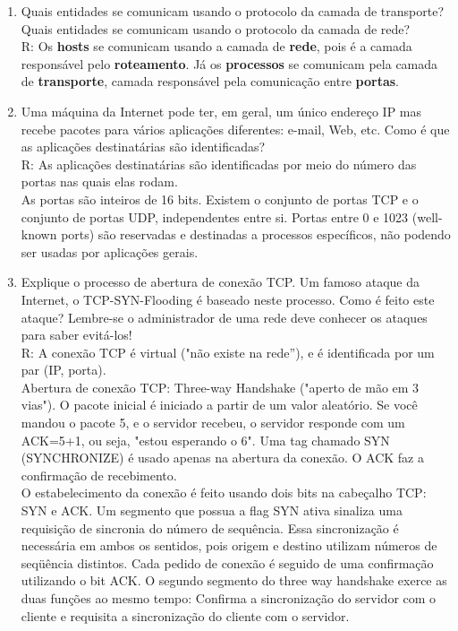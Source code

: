 \documentclass{article}
\begin{document}
\begin{enumerate}

	\item Quais entidades se comunicam usando o protocolo da camada de transporte? Quais entidades se comunicam usando o protocolo da camada de rede?
	\\
	R: Os \textbf{hosts} se comunicam usando a camada de \textbf{rede}, pois é a camada responsável pelo \textbf{roteamento}. Já os \textbf{processos} se comunicam pela camada de
	\textbf{transporte}, camada responsável pela comunicação entre \textbf{portas}.

	\item Uma máquina da Internet pode ter, em geral, um único endereço IP mas recebe pacotes para vários aplicações diferentes: e-mail, Web, etc. Como é que as aplicações destinatárias são identificadas?
	\\R: As aplicações destinatárias são identificadas por meio do número das portas nas quais elas rodam.
	\\ As portas são inteiros de 16 bits. Existem o conjunto de portas TCP e o conjunto de portas UDP, independentes entre si. Portas entre 0 e 1023 (well-known ports) são reservadas e destinadas a processos específicos, não podendo ser usadas por aplicações gerais.

	\item Explique o processo de abertura de conexão TCP. Um famoso ataque da Internet, o TCP-SYN-Flooding é baseado neste processo. Como é feito este ataque? Lembre-se o administrador de uma rede deve conhecer os ataques para saber evitá-los!
	\\ R: A conexão TCP é virtual ("não existe na rede”), e é identificada por um par (IP, porta).
	\\ Abertura de conexão TCP: Three-way Handshake ("aperto de mão em 3 vias").
	O pacote inicial é iniciado a partir de um valor aleatório. Se você mandou o
	pacote 5, e o servidor recebeu, o servidor responde com um ACK=5+1, ou seja,
	"estou esperando o 6". Uma tag chamado SYN (SYNCHRONIZE) é usado apenas na
	abertura da conexão. O ACK faz a confirmação de recebimento.
	\\O estabelecimento da conexão é feito usando dois bits na cabeçalho TCP: SYN e ACK. Um segmento que possua a flag SYN ativa sinaliza uma requisição de sincronia do número de sequência. Essa sincronização é necessária em ambos os sentidos, pois origem e destino utilizam números de seqüência distintos. Cada pedido de conexão é seguido de uma confirmação utilizando o bit ACK. O segundo segmento do three way handshake exerce as duas funções ao mesmo tempo: Confirma a sincronização do servidor com o cliente e requisita a sincronização do cliente com o servidor.
	\\
	

\end{enumerate}
\end{document}
